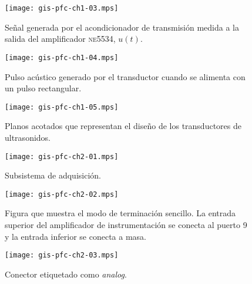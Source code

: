 \documentclass[a4paper,12pt]				{article}
\begin{document}
\begin{figure}
	\begin{center}
		\texttt{[image: gis-pfc-ch1-03.mps]}
	\end{center}
	\caption[Señal a la salida del amplificador \textsc{ne5534},
	$u(t)$]{Señal generada por el acondicionador de transmisión medida
	a la salida del amplificador \textsc{ne5534}, $u(t)$.}
	\label{fig:txacvo}
\end{figure}

\begin{figure}
	\begin{center}
		\texttt{[image: gis-pfc-ch1-04.mps]}
	\end{center}
	\caption[Pulso acústico generado por el transductor]{Pulso acústico
	generado por el transductor cuando se alimenta con un pulso
	rectangular.}
	\label{fig:pulse}
\end{figure}

\begin{figure}
	\begin{center}
		\texttt{[image: gis-pfc-ch1-05.mps]}
	\end{center}
	\caption[Transductores de ultrasonidos]{Planos acotados que
	representan el diseño de los transductores de ultrasonidos.}
	\label{fig:transducers}
\end{figure}

\clearpage

\begin{figure}
	\begin{center}
		\texttt{[image: gis-pfc-ch2-01.mps]}
	\end{center}
	\caption[Subsistema de adquisición]{Subsistema de adquisición.}
	\label{fig:subacqui}
\end{figure}

\begin{figure}
	\begin{center}
		\texttt{[image: gis-pfc-ch2-02.mps]}
	\end{center}
	\caption[Ejemplo de configuración de terminación]{Figura que
	muestra el modo de terminación sencillo. La entrada superior del
	amplificador de instrumentación se conecta al puerto 9 y la entrada
	inferior se conecta a masa.}
	\label{fig:termmodes}
\end{figure}

\begin{figure}
	\begin{center}
		\texttt{[image: gis-pfc-ch2-03.mps]}
	\end{center}
	\caption[Conector etiquetado como \emph{analog}]{Conector
	etiquetado como \emph{analog}.}
	\label{fig:analog}
\end{figure}
\end{document}
